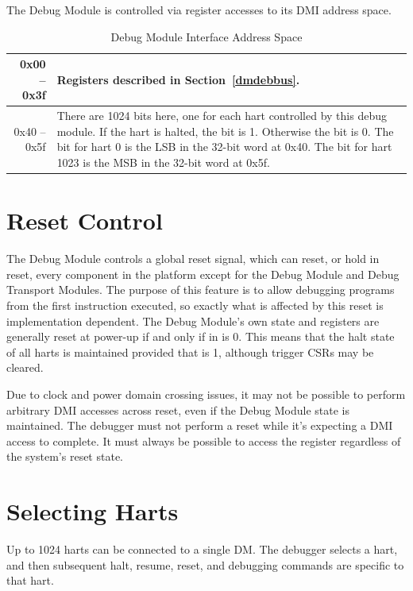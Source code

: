 The Debug Module is controlled via register accesses to its DMI address space.

\begin{table}[htp]
    \centering
    \caption{Debug Module Interface Address Space}
    \label{tab:header}
    \begin{tabulary}{\textwidth}{|r|L|}
        \hline
        0x00 -- 0x3f & Registers described in Section~\ref{dmdebbus}. \\
        \hline
        0x40 -- 0x5f & There are 1024 bits here, one for each hart controlled
        by this debug module. If the hart is halted, the bit is 1.  Otherwise
        the bit is 0. The bit for hart 0 is the LSB in the 32-bit word at 0x40.
        The bit for hart 1023 is the MSB in the 32-bit word at 0x5f. \\
        \hline
    \end{tabulary}
\end{table}

\section{Reset Control} \label{reset}

The Debug Module controls a global reset signal, which can
reset, or hold in reset, every component in the platform
except for the Debug Module and Debug
Transport Modules. The purpose of this feature is to allow debugging
programs from the first instruction executed, so exactly what is affected
by this reset is implementation dependent. The Debug Module's own state and registers are
generally reset at power-up if and only if
\Fdmactive in \Rdmcontrol is 0. This means that the halt state of all harts is
maintained provided that \Fdmactive is 1, although trigger CSRs may be cleared.

Due to clock and power domain crossing issues,
it may not be possible to perform arbitrary DMI accesses across reset,
even if the Debug Module state is maintained. The debugger must not perform
a reset while it's expecting a DMI access to complete. It must always be
possible to access
the \Rdmcontrol register regardless of the system's reset state.

\section{Selecting Harts} \label{selectingharts}

Up to 1024 harts can be connected to a single DM. The debugger
selects a hart, and then subsequent halt, resume, reset, and debugging
commands are specific to that hart.

